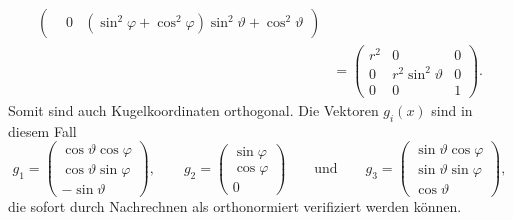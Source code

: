 \begin{beispiel}
\begin{align*}
\begin{pmatrix}
&0
&(\sin^2\varphi+\cos^2\varphi)\sin^2\vartheta + \cos^2\vartheta
\end{pmatrix}
\\
&=
\begin{pmatrix}
r^2 &         0           & 0 \\
 0  & r^2 \sin^2\vartheta & 0 \\
 0  &         0           & 1
\end{pmatrix}.
\end{align*}
Somit sind auch Kugelkoordinaten orthogonal.
Die Vektoren $g_i(x)$ sind in diesem Fall
\[
g_1
=
\begin{pmatrix}
\cos\vartheta\cos\varphi\\
\cos\vartheta\sin\varphi\\
-\sin\vartheta
\end{pmatrix}
,\qquad
g_2
=
\begin{pmatrix}
\sin\varphi\\
\cos\varphi\\
0
\end{pmatrix}
\qquad\text{und}\qquad
g_3
=
\begin{pmatrix}
\sin\vartheta\cos\varphi\\
\sin\vartheta\sin\varphi\\
\cos\vartheta
\end{pmatrix},
\]
die sofort durch Nachrechnen als orthonormiert verifiziert werden können.
\end{beispiel}


